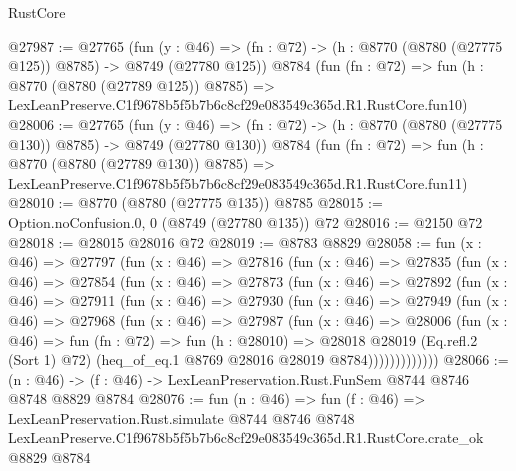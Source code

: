 \begin{lexlean}{RustCore}
\begin{coremodule}
@27987 := @27765
    (fun (y : @46) => (fn : @72) -> (h : @8770 (@8780 (@27775 @125)) @8785) -> @8749 (@27780 @125))
    @8784
    (fun (fn : @72) =>
    fun (h : @8770 (@8780 (@27789 @125)) @8785) =>
    LexLeanPreserve.C1f9678b5f5b7b6c8cf29e083549c365d.R1.RustCore.fun10)
@28006 := @27765
    (fun (y : @46) => (fn : @72) -> (h : @8770 (@8780 (@27775 @130)) @8785) -> @8749 (@27780 @130))
    @8784
    (fun (fn : @72) =>
    fun (h : @8770 (@8780 (@27789 @130)) @8785) =>
    LexLeanPreserve.C1f9678b5f5b7b6c8cf29e083549c365d.R1.RustCore.fun11)
@28010 := @8770 (@8780 (@27775 @135)) @8785
@28015 := Option.noConfusion.{0, 0} (@8749 (@27780 @135)) @72
@28016 := @2150 @72
@28018 := @28015 @28016 @72
@28019 := @8783 @8829
@28058 := fun (x : @46) =>
  @27797
    (fun (x : @46) =>
    @27816
      (fun (x : @46) =>
      @27835
        (fun (x : @46) =>
        @27854
          (fun (x : @46) =>
          @27873
            (fun (x : @46) =>
            @27892
              (fun (x : @46) =>
              @27911
                (fun (x : @46) =>
                @27930
                  (fun (x : @46) =>
                  @27949
                    (fun (x : @46) =>
                    @27968
                      (fun (x : @46) =>
                      @27987
                        (fun (x : @46) =>
                        @28006
                          (fun (x : @46) =>
                          fun (fn : @72) =>
                          fun (h : @28010) =>
                          @28018
                            @28019
                            (Eq.refl.{2} (Sort 1) @72)
                            (heq_of_eq.{1} @8769 @28016 @28019 @8784)))))))))))))
@28066 := (n : @46) -> (f : @46) -> LexLeanPreservation.Rust.FunSem @8744 @8746 @8748 @8829 @8784
@28076 := fun (n : @46) =>
  fun (f : @46) =>
  LexLeanPreservation.Rust.simulate
    @8744
    @8746
    @8748
    LexLeanPreserve.C1f9678b5f5b7b6c8cf29e083549c365d.R1.RustCore.crate_ok
    @8829
    @8784
\end{coremodule}
\end{lexlean}

